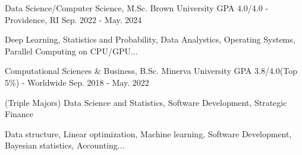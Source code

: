 \begin{cventries}
  \cventry
    {Data Science/Computer Science, M.Sc.}
    {Brown University}
    {GPA 4.0/4.0 - Providence, RI}
    {Sep. 2022 - May. 2024}
    {
    \begin{cvitems}
        \item {Deep Learning, Statistics and Probability, Data Analystics, Operating Systems, Parallel Computing on CPU/GPU...}
    \end{cvitems}
    }

  \cventry
    {Computational Sciences \& Business, B.Sc.}
    {Minerva University}
    {GPA 3.8/4.0(Top 5\%) - Worldwide}
    {Sep. 2018 - May. 2022}
    {
      \begin{cvitems}
        \item {(Triple Majors) Data Science and Statistics, Software Development, Strategic Finance}
        \item {Data structure, Linear optimization, Machine learning, Software Development, Bayesian statistics, Accounting...}
      \end{cvitems}
    }
\end{cventries}
